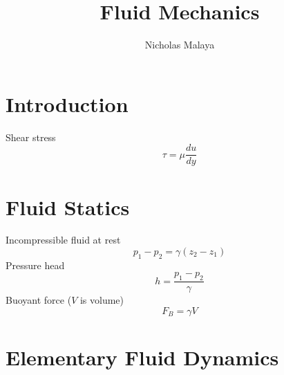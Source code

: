 \documentclass{article}
\title{\bf{Fluid Mechanics}}
\author{Nicholas Malaya} \date{}
\begin{document}
\maketitle


%
%
\newpage
\section{Introduction}

Shear stress
\begin{equation}
    \tau = \mu\frac{du}{dy}
\end{equation}

%
%
\section{Fluid Statics}

Incompressible fluid at rest
\begin{equation}
    p_1-p_2 = \gamma (z_2-z_1)
\end{equation}
\newline
\newline
Pressure head
\begin{equation}
    h = \frac{p_1-p_2}{\gamma}
\end{equation}
\newline
\newline
Buoyant force ($V$ is volume)
\begin{equation}
    F_B = \gamma V
\end{equation}

%
%
\newpage
\section{Elementary Fluid Dynamics}
\end{document}
